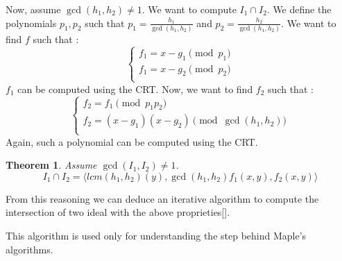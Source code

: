 \documentclass{article}
\newtheorem{theorem}{Theorem}[section]
\begin{document}
Now, assume $\gcd(h_{1}, {h_2}) \neq 1$.
We want to compute $I_{1} \cap I_{2}$. We define the polynomials $p_{1}, p_{2}$ such that $p_{1} = \displaystyle \frac{h_{1}}{\gcd(h_{1}, h_{2})}$ and $p_{2} = \displaystyle \frac{h_{2}}{\gcd(h_{1}, h_{2})}$. We want to find $f$ such that : 
\begin{displaymath}
    \left\{
    \begin{array}{ll}
        f_{1} = x-g_{1} \pmod {p_{1}} \\
        f_{1} = x-g_{2} \pmod {p_{2}} \\
    \end{array}
    \right.
\end{displaymath}
$f_{1}$ can be computed using the CRT. Now, we want to find $f_{2}$ such that : 
\begin{displaymath}
    \left\{
    \begin{array}{ll}
        f_{2} = f_{1} \pmod {p_{1}p_{2}} \\
        f_{2} = (x-g_{1})(x-g_{2}) \pmod {\gcd(h_{1}, h_{2})} \\
    \end{array}
    \right.
\end{displaymath}
Again, such a polynomial can be computed using the CRT. 

\begin{theorem}
    Assume $\gcd(I_{1}, I_{2}) \neq 1$. 
    \begin{displaymath}
        I_{1} \cap I_{2} = \langle lcm(h_{1}, h_{2})(y), \gcd(h_{1},h_{2})f_{1}(x,y), f_{2}(x,y) \rangle
    \end{displaymath}
\end{theorem}

From this reasoning we can deduce an iterative algorithm to compute the intersection of two ideal with the above proprieties[].


This algorithm is used only for understanding the step behind Maple's algorithms.
\end{document}
